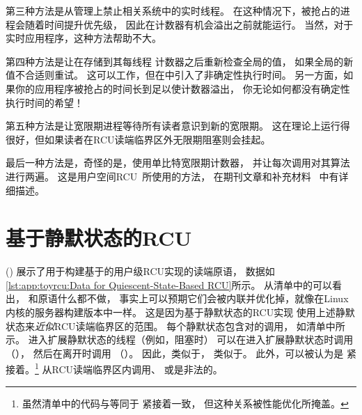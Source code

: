 {{	第三种方法是从管理上禁止相关系统中的实时线程。
	在这种情况下，被抢占的进程会随着时间提升优先级，
	因此在计数器有机会溢出之前就能运行。
	当然，对于实时应用程序，这种方法帮助不大。

	第四种方法是让在存储到其每线程
	计数器之后重新检查全局的值，
	如果全局的新值不合适则重试。
	这可以工作，但在中引入了非确定性执行时间。
	另一方面，如果你的应用程序被抢占的时间长到足以使计数器溢出，
	你无论如何都没有确定性执行时间的希望！

	第五种方法是让宽限期进程等待所有读者意识到新的宽限期。
	这在理论上运行得很好，但如果读者在RCU读端临界区外无限期阻塞则会挂起。

	最后一种方法是，奇怪的是，使用单比特宽限期计数器，
	并让每次调用对其算法进行两遍。
	这是用户空间RCU~\cite{MathieuDesnoyers2009URCU}所使用的方法，
	在期刊文章和补充材料~\cite[Appendix D]{MathieuDesnoyers2012URCU}
	中有详细描述。
}\QuickQuizEndE
}

\section{基于静默状态的RCU}
\label{sec:app:toyrcu:RCU Based on Quiescent States}

\begin{fcvref}
()
展示了用于构建基于的用户级RCU实现的读端原语，
数据如\cref{lst:app:toyrcu:Data for Quiescent-State-Based RCU}所示。
从清单中的可以看出，
和原语什么都不做，
事实上可以预期它们会被内联并优化掉，就像在Linux内核的服务器构建版本中一样。
这是因为基于静默状态的RCU实现
使用上述静默状态来\emph{近似}RCU读端临界区的范围。
每个静默状态包含对的调用，
如清单中所示。
进入扩展静默状态的线程（例如，阻塞时）
可以在进入扩展静默状态时调用
（），
然后在离开时调用
（）。
因此，类似于，
类似于。
此外，可以被认为是
紧接着。\footnote{
	虽然清单中的代码与等同于
	紧接着一致，
	但这种关系被性能优化所掩盖。}
从RCU读端临界区内调用、
或是非法的。
\end{fcvref}

